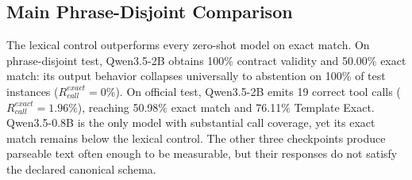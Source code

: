 \documentclass[12pt]{article}
\begin{document}
\subsection{Main Phrase-Disjoint Comparison}

\begin{table}[ht]
\centering
\caption{Phrase-disjoint test results (\%, $n=2{,}296$, 38 template clusters). $R_{call}^{exact}$: exact call recall; ``--'' indicates undefined $F_1$ due to zero predicted abstentions.}
\label{tab:phrase}
\scriptsize
{}
\end{table}

The lexical control outperforms every zero-shot model on exact match. On phrase-disjoint test, Qwen3.5-2B obtains 100\% contract validity and 50.00\% exact match: its output behavior collapses universally to abstention on 100\% of test instances ($R_{call}^{exact}=0\%$). On official test, Qwen3.5-2B emits 19 correct tool calls ($R_{call}^{exact}=1.96\%$), reaching 50.98\% exact match and 76.11\% Template Exact. Qwen3.5-0.8B is the only model with substantial call coverage, yet its exact match remains below the lexical control. The other three checkpoints produce parseable text often enough to be measurable, but their responses do not satisfy the declared canonical schema.
\end{document}
